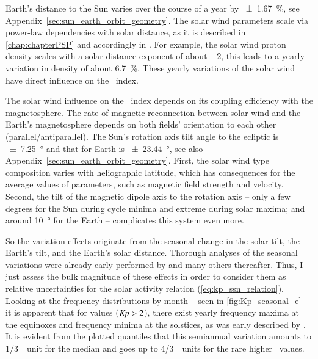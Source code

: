 Earth's distance to the Sun varies over the course of a year by \SI{+-1.67}{\percent}, see Appendix~\ref{sec:sun_earth_orbit_geometry}. The solar wind parameters scale via power-law dependencies with solar distance, as it is described in \autoref{chap:chapterPSP} and accordingly in \citet{Venzmer2018}. For example, the solar wind proton density scales with a solar distance exponent of about $-2$, this leads to a yearly variation in density of about \SI{6.7}{\percent}. These yearly variations of the solar wind have direct influence on the \Kp{}~index.

The solar wind influence on the \Kp{}~index depends on its coupling efficiency with the magnetosphere. The rate of magnetic reconnection between solar wind and the Earth's magnetosphere depends on both fields' orientation to each other (parallel/antiparallel). The Sun's rotation axis tilt angle to the ecliptic is \SI{+-7.25}{\degree} and that for Earth is \SI{+-23.44}{\degree}, see also Appendix~\ref{sec:sun_earth_orbit_geometry}. First, the solar wind type composition varies with heliographic latitude, which has consequences for the average values of parameters, such as magnetic field strength and velocity. Second, the tilt of the magnetic dipole axis to the rotation axis -- only a few degrees for the Sun during cycle minima and extreme during solar maxima; and around \SI{10}{\degree} for the Earth -- complicates this system even more.

So the \Kp{} variation effects originate from the seasonal change in the solar tilt, the Earth's tilt, and the Earth's solar distance. Thorough analyses of the seasonal variations were already early performed by \citet{Cortie1912} and many others thereafter. Thus, I just assess the bulk magnitude of these effects in order to consider them as relative uncertainties for the solar activity relation (\ref{eq:kp_ssn_relation}). Looking at the \Kp{} frequency distributions by month -- seen in \autoref{fig:Kp_seasonal_e} -- it is apparent that for values ($\textit{Kp}{} > 2$), there exist yearly frequency maxima at the equinoxes and frequency minima at the solstices, as was early described by \citet{Cortie1912}. It is evident from the plotted quantiles that this semiannual variation amounts to $1/3$~\Kp~unit for the median \Kp{} and goes up to 4/3~\Kp~units for the rare higher \Kp~values.


